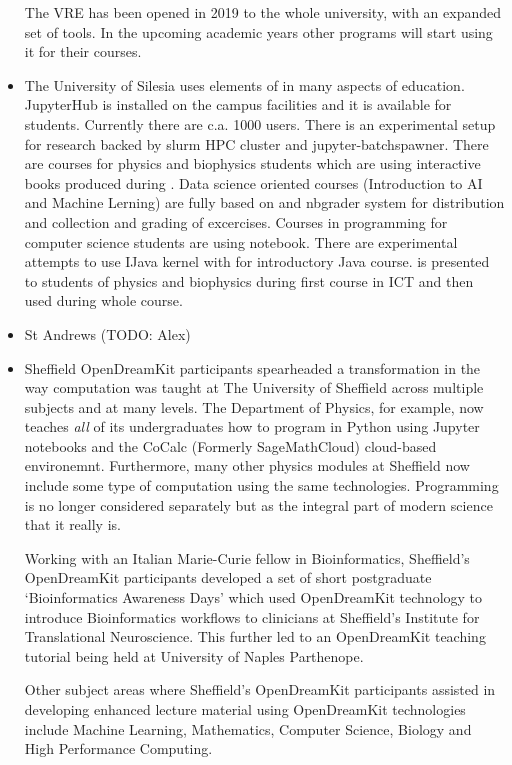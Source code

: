 \documentclass{deliverablereport}
\begin{document}
\begin{itemize}
  The VRE has been opened in 2019 to the whole university, with an
  expanded set of tools. In the upcoming academic years other programs
  will start using it for their courses.
\item
  The University of Silesia uses elements of \ODK in many aspects of
  education. JupyterHub is installed on the campus facilities and it
  is available for students. Currently there are c.a. 1000
  users. There is an experimental setup for research backed by slurm
  HPC cluster and jupyter-batchspawner. There are courses for physics
  and biophysics students which are using interactive books produced
  during \ODK. Data science oriented courses (Introduction to AI and
  Machine Lerning) are fully based on \Jupyter and nbgrader system for
  distribution and collection and grading of excercises. Courses in
  \Python programming for computer science students are using \Jupyter
  notebook. There are experimental attempts to use IJava kernel with
  \Jupyter for introductory Java course. \SageMath is presented to
  students of physics and biophysics during first course in ICT and
  then used during whole course. 
\item
  St Andrews (TODO: Alex)
\item
  Sheffield OpenDreamKit participants spearheaded a transformation in
  the way computation was taught at The University of Sheffield across
  multiple subjects and at many levels. The Department of Physics, for
  example, now teaches \emph{all} of its undergraduates how to program
  in Python using Jupyter notebooks and the CoCalc (Formerly
  SageMathCloud) cloud-based environemnt. Furthermore, many other
  physics modules at Sheffield now include some type of computation
  using the same technologies. Programming is no longer considered
  separately but as the integral part of modern science that it really
  is.

  Working with an Italian Marie-Curie fellow in Bioinformatics,
  Sheffield's OpenDreamKit participants developed a set of short
  postgraduate `Bioinformatics Awareness Days' which used OpenDreamKit
  technology to introduce Bioinformatics workflows to clinicians at
  Sheffield's Institute for Translational Neuroscience. This further led
  to an OpenDreamKit teaching tutorial being held at University of
  Naples Parthenope.

  Other subject areas where Sheffield's OpenDreamKit participants
  assisted in developing enhanced lecture material using OpenDreamKit
  technologies include Machine Learning, Mathematics, Computer Science,
  Biology and High Performance Computing.
\end{itemize}
\end{document}
